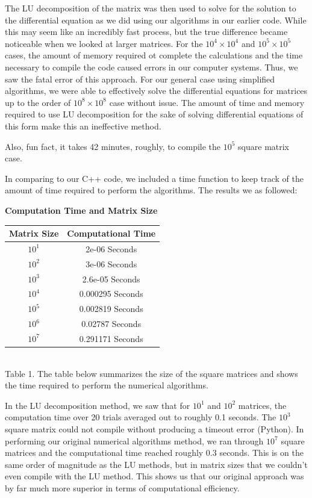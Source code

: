 \documentclass{article}
\begin{document}
The LU decomposition of the matrix was then used to solve for the solution to the differential equation as we did using our algorithms in our earlier code. While this may seem like an incredibly fast process, but the true difference became noticeable when we looked at larger matrices. For the $10^{4}\times 10^{4}$ and $10^{5}\times 10^{5}$ cases, the amount of memory required ot complete the calculations and the time necessary to compile the code caused errors in our computer systems. Thus, we saw the fatal error of this approach. For our general case using simplified algorithms, we were able to effectively solve the differential equations for matrices up to the order of $10^{8}\times 10^{8}$ case without issue. The amount of time and memory required to use LU decomposition for the sake of solving differential equations of this form make this an ineffective method. 

Also, fun fact, it takes 42 minutes, roughly, to compile the $10^{5}$ square matrix case.

In comparing to our C++ code, we included a time function to keep track of the amount of time required to perform the algorithms. The results we as followed:


\begin{center}
	\textbf{Computation Time and Matrix Size}\\
	\begin{tabular}{|c|c|}
		\hline
		Matrix Size & Computational Time\\
		\hline
		$10^{1}$ &2e-06 Seconds\\
		\hline
		$10^{2}$ &3e-06 Seconds\\
		\hline
		$10^{3}$ & 2.6e-05 Seconds\\
		\hline
		$10^{4}$ & 0.000295 Seconds\\
		\hline
		$10^{5}$ & 0.002819 Seconds\\
		\hline
		$10^{6}$ & 0.02787 Seconds\\
		\hline
		$10^{7}$ & 0.291171 Seconds\\
		\hline
	\end{tabular}
\\Table 1. The table below summarizes the size of the square matrices and shows the time required to perform the numerical algorithms.
\end{center}

In the LU decomposition method, we saw that for $10^{1}$ and $10^{2}$ matrices, the computation time over 20 trials averaged out to roughly 0.1 seconds. The $10^{3}$ square matrix could not compile without producing a timeout error (Python). In performing our original numerical algorithms method, we ran through $10^{7}$ square matrices and the computational time reached roughly 0.3 seconds. This is on the same order of magnitude as the LU methods, but in matrix sizes that we couldn't even compile with the LU method. This shows us that our original approach was by far much more superior in terms of computational efficiency.
\end{document}
